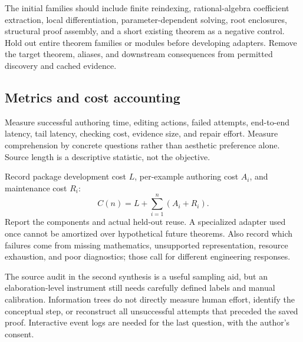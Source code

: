 \documentclass[11pt,letterpaper]{article}
\theoremstyle{definition}
\begin{document}
The initial families should include finite reindexing, rational-algebra coefficient
extraction, local differentiation, parameter-dependent solving, root enclosures,
structural proof assembly, and a short existing theorem as a negative control.
Hold out entire theorem families or modules before developing adapters. Remove the
target theorem, aliases, and downstream consequences from permitted discovery and
cached evidence.

\subsection{Metrics and cost accounting}
Measure successful authoring time, editing actions, failed attempts, end-to-end
latency, tail latency, checking cost, evidence size, and repair effort. Measure
comprehension by concrete questions rather than aesthetic preference alone.
Source length is a descriptive statistic, not the objective.

Record package development cost \(L\), per-example authoring cost \(A_i\), and
maintenance cost \(R_i\):
\[
 C(n)=L+\sum_{i=1}^{n}(A_i+R_i).
\]
Report the components and actual held-out reuse. A specialized adapter used once
cannot be amortized over hypothetical future theorems. Also record which failures
come from missing mathematics, unsupported representation, resource exhaustion,
and poor diagnostics; those call for different engineering responses.

The source audit in the second synthesis is a useful sampling aid, but an
elaboration-level instrument still needs carefully defined labels and manual
calibration\cite{review,synthesis}. Information trees do not directly measure
human effort, identify the conceptual step, or reconstruct all unsuccessful
attempts that preceded the saved proof. Interactive event logs are needed for the
last question, with the author's consent.
\end{document}
